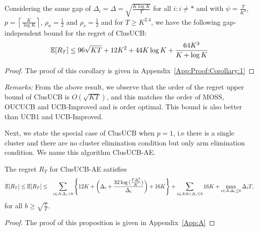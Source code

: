 

\begin{corollary}
\label{Result:Corollary:1}
Considering the same gap of $\Delta_{i} = \Delta =\sqrt{\frac{K\log K}{T}}$ for all ${i:i\neq *}$ and with $\psi=\frac{T}{K^2}$, $p=\left\lceil\frac{K}{\log K}\right\rceil$, $\rho_{a}=\frac{1}{2}$ and $\rho_{s}=\frac{1}{2}$ and for $T\geq K^{2.4}$, we have the following gap-independent bound for the regret of ClusUCB:
\begin{align*}
\mathbb{E}[R_{T}]\leq 96\sqrt{KT} + 12K^2 + 44K\log K + \dfrac{64 K^3}{K+\log K}
\end{align*}
\end{corollary}

\begin{proof}
The proof of this corollary is given in Appendix~\ref{App:Proof:Corollary:1}
\end{proof}

\textit{Remarks:} From the above result, we observe that the order of the regret upper bound of ClusUCB is $O(\sqrt{KT})$, and this matches the order of MOSS, OUCUCB and UCB-Improved and is order optimal. This  bound is also better than UCB1 and UCB-Improved. 

Next, we state the special case of ClusUCB when $p=1$, i.e there is a single cluster and there are no cluster elimination condition but only arm elimination condition. We name this algorithm ClusUCB-AE.


\begin{proposition}
\label{proofTheorem:Prop:1}
The regret $R_T$ for ClusUCB-AE satisfies
\begin{align*}
&\mathbb{E} [R_{T}]\leq \mathbb{E}[R_{T}] \leq &\sum\limits_{i\in A:\Delta_{i} > b} \left\lbrace 12K + \bigg(\Delta_{i}+\dfrac{32\log{(\frac{T\Delta_i^2}{K})}}{\Delta_{i}}\bigg) + 16K\right\rbrace +\sum\limits_{i\in A:0 < \Delta_{i}\leq b} 16K + \max_{i\in A:\Delta_{i}\leq b}\Delta_{i}T,
\end{align*}
for all $b\geq\sqrt{\frac{e}{T}}$.
\end{proposition}

\begin{proof}
The proof of this proposition is given in Appendix~\ref{App:A}
\end{proof}


